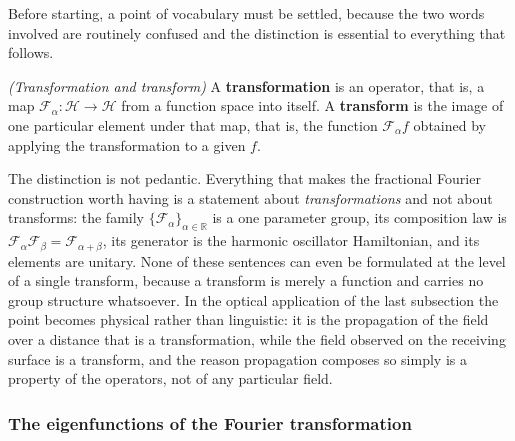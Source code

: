 		Before starting, a point of vocabulary must be settled, because the two words involved are routinely confused and the distinction is essential to everything that follows.

		\begin{myDef}
			\textit{(Transformation and transform)} A \textbf{transformation} is an operator, that is, a map $\mathcal{F}_{\alpha} : \mathcal{H} \to \mathcal{H}$ from a function space into itself. A \textbf{transform} is the image of one particular element under that map, that is, the function $\mathcal{F}_{\alpha}f$ obtained by applying the transformation to a given $f$.
		\end{myDef}

		The distinction is not pedantic. Everything that makes the fractional Fourier construction worth having is a statement about \textit{transformations} and not about transforms: the family $\{\mathcal{F}_{\alpha}\}_{\alpha\in\mathbb{R}}$ is a one parameter group, its composition law is $\mathcal{F}_{\alpha}\mathcal{F}_{\beta} = \mathcal{F}_{\alpha+\beta}$, its generator is the harmonic oscillator Hamiltonian, and its elements are unitary. None of these sentences can even be formulated at the level of a single transform, because a transform is merely a function and carries no group structure whatsoever. In the optical application of the last subsection the point becomes physical rather than linguistic: it is the propagation of the field over a distance that is a transformation, while the field observed on the receiving surface is a transform, and the reason propagation composes so simply is a property of the operators, not of any particular field.

		\subsubsection{The eigenfunctions of the Fourier transformation}

